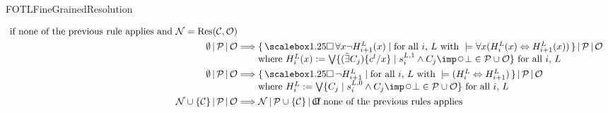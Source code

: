 \begin{entry}{FOTLFineGrainedResolution}
\begin{calculus}
\begin{small}
\begin{align*}
\mbox{ if none of the previous rule applies and $\NewSet = \mathrm{Res}(\mathcal{C}, \OldSet)$}
\\
\ProverState{\emptyset}{\ProcessedSet}{\OldSet}
&\Longrightarrow
\begin{array}[t]{@{}l@{}}
\ProverState{%
\Set{\Always \forall x \neg H_{i+1}^L(x)}{\mbox{for all $i$,
$L$ with } \models \forall x (H_i^L(x) \Leftrightarrow H_{i+1}^L(x))}%
}{\ProcessedSet}{\OldSet}\\
\mbox{where }
H_i^L(x) := \bigvee \predset{(\existentialClosure C_j)\{c^l /
x\}}{s_i^{L,1}\land C_j\imp\Next\bot\in \ProcessedSet \cup \OldSet}
\mbox{ for all $i$, $L$}
\end{array}
\\
\ProverState{\emptyset}{\ProcessedSet}{\OldSet}
&\Longrightarrow
\begin{array}[t]{@{}l@{}}
\ProverState{%
\Set{\Always \neg H_{i+1}^L}{\mbox{for all $i$,
$L$ with } \models (H_i^L \Leftrightarrow H_{i+1}^L)}%
}{\ProcessedSet}{\OldSet}\\
\mbox{where }
H_i^L := \bigvee 
\predset{C_j}{s_i^{L,0}\land C_j\imp\Next\bot\in \ProcessedSet \cup \OldSet}
\mbox{ for all $i$, $L$}
\end{array}
\\
%
\ProverState{\NewSet \cup \SetEnum{\mathcal{C}}}{\ProcessedSet}{\OldSet}
&\Longrightarrow
\makebox[56pt][l]{$\ProverState{\NewSet}{\ProcessedSet\cup\SetEnum{\mathcal{C}}}{\OldSet}$}
\mbox{ if none of the previous rules applies}
\end{align*}
\end{small}
\vspace{-20pt}
\end{calculus}


\end{entry}
